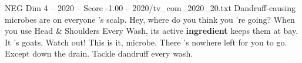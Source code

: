 \begin{textsample}{NEG Dim 4 – 2020 – Score -1.00 – 2020/tv\_com\_2020\_20.txt}  \label{ex:f4_neg_066}
Dandruff-causing microbes are on everyone 's scalp.
Hey, where do you think you 're going?
When you use Head \& Shoulders Every Wash, its active \textbf{ingredient} keeps them at bay.
It 's goats.
Watch out!
This is it, microbe.
There 's nowhere left for you to go.
Except down the drain.
Tackle dandruff every wash.

\end{textsample}
